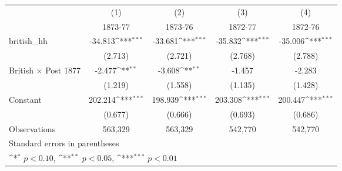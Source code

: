 {
\def\sym#1{\ifmmode^{#1}\else\(^{#1}\)\fi}
\begin{tabular}{l*{4}{c}}
\hline\hline
                    &\multicolumn{1}{c}{(1)}&\multicolumn{1}{c}{(2)}&\multicolumn{1}{c}{(3)}&\multicolumn{1}{c}{(4)}\\
                    &\multicolumn{1}{c}{1873-77}&\multicolumn{1}{c}{1873-76}&\multicolumn{1}{c}{1872-77}&\multicolumn{1}{c}{1872-76}\\
\hline
british\_hh          &     -34.813\sym{***}&     -33.681\sym{***}&     -35.832\sym{***}&     -35.006\sym{***}\\
                    &     (2.713)         &     (2.721)         &     (2.768)         &     (2.788)         \\
[1em]
British $\times$ Post 1877&      -2.477\sym{**} &      -3.608\sym{**} &      -1.457         &      -2.283         \\
                    &     (1.219)         &     (1.558)         &     (1.135)         &     (1.428)         \\
[1em]
Constant            &     202.214\sym{***}&     198.939\sym{***}&     203.308\sym{***}&     200.447\sym{***}\\
                    &     (0.677)         &     (0.666)         &     (0.693)         &     (0.686)         \\
\hline
Observations        &     563,329         &     563,329         &     542,770         &     542,770         \\
\hline\hline
\multicolumn{5}{l}{\footnotesize Standard errors in parentheses}\\
\multicolumn{5}{l}{\footnotesize \sym{*} \(p<0.10\), \sym{**} \(p<0.05\), \sym{***} \(p<0.01\)}\\
\end{tabular}
}
